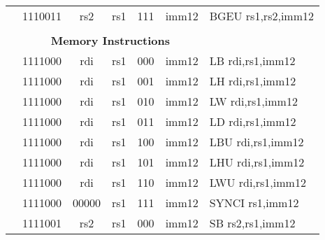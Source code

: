 \begin{table}[p]
\begin{small}
\begin{center}
\begin{tabular}{rcccccccccccl}
&
\multicolumn{2}{|c|}{1110011} &
\multicolumn{1}{c|}{rs2} &
\multicolumn{1}{c|}{rs1} &
\multicolumn{2}{c|}{111} &
\multicolumn{5}{c|}{imm12} & BGEU rs1,rs2,imm12 \\
\cline{2-12}
  

&
\multicolumn{11}{c}{} & \\
&
\multicolumn{11}{c}{\bf Memory Instructions} & \\
\cline{2-12}
  

&
\multicolumn{2}{|c|}{1111000} &
\multicolumn{1}{c|}{rdi} &
\multicolumn{1}{c|}{rs1} &
\multicolumn{2}{c|}{000} &
\multicolumn{5}{c|}{imm12} & LB rdi,rs1,imm12 \\
\cline{2-12}
  

&
\multicolumn{2}{|c|}{1111000} &
\multicolumn{1}{c|}{rdi} &
\multicolumn{1}{c|}{rs1} &
\multicolumn{2}{c|}{001} &
\multicolumn{5}{c|}{imm12} & LH rdi,rs1,imm12 \\
\cline{2-12}
  

&
\multicolumn{2}{|c|}{1111000} &
\multicolumn{1}{c|}{rdi} &
\multicolumn{1}{c|}{rs1} &
\multicolumn{2}{c|}{010} &
\multicolumn{5}{c|}{imm12} & LW rdi,rs1,imm12 \\
\cline{2-12}
  

&
\multicolumn{2}{|c|}{1111000} &
\multicolumn{1}{c|}{rdi} &
\multicolumn{1}{c|}{rs1} &
\multicolumn{2}{c|}{011} &
\multicolumn{5}{c|}{imm12} & LD rdi,rs1,imm12 \\
\cline{2-12}
  

&
\multicolumn{2}{|c|}{1111000} &
\multicolumn{1}{c|}{rdi} &
\multicolumn{1}{c|}{rs1} &
\multicolumn{2}{c|}{100} &
\multicolumn{5}{c|}{imm12} & LBU rdi,rs1,imm12 \\
\cline{2-12}
  

&
\multicolumn{2}{|c|}{1111000} &
\multicolumn{1}{c|}{rdi} &
\multicolumn{1}{c|}{rs1} &
\multicolumn{2}{c|}{101} &
\multicolumn{5}{c|}{imm12} & LHU rdi,rs1,imm12 \\
\cline{2-12}
  

&
\multicolumn{2}{|c|}{1111000} &
\multicolumn{1}{c|}{rdi} &
\multicolumn{1}{c|}{rs1} &
\multicolumn{2}{c|}{110} &
\multicolumn{5}{c|}{imm12} & LWU rdi,rs1,imm12 \\
\cline{2-12}
  

&
\multicolumn{2}{|c|}{1111000} &
\multicolumn{1}{c|}{00000} &
\multicolumn{1}{c|}{rs1} &
\multicolumn{2}{c|}{111} &
\multicolumn{5}{c|}{imm12} & SYNCI rs1,imm12 \\
\cline{2-12}
  

&
\multicolumn{2}{|c|}{1111001} &
\multicolumn{1}{c|}{rs2} &
\multicolumn{1}{c|}{rs1} &
\multicolumn{2}{c|}{000} &
\multicolumn{5}{c|}{imm12} & SB rs2,rs1,imm12 \\
\cline{2-12}
  


\end{tabular}
\end{center}
\end{small}
\end{table}
